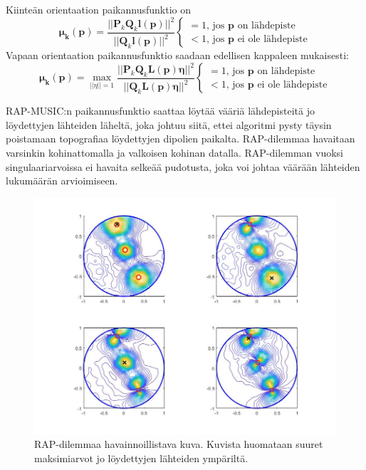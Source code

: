 Kiinteän orientaation paikannusfunktio on
\begin{equation}
    \mathbf{\mu_k(p)} = \frac{||\mathbf{P}_k\mathbf{Q}_k\mathbf{l(p)}||^2}{||\mathbf{Q}_k\mathbf{l(p)}||^2}
    \begin{cases}
    =1\text{, jos $\mathbf{p}$ on lähdepiste}\\
    <1\text{, jos $\mathbf{p}$ ei ole lähdepiste}
     \end{cases}
\end{equation}
Vapaan orientaation paikannusfunktio saadaan edellisen kappaleen mukaisesti:
\begin{equation}
    \mathbf{\mu_k(p)} = \max_{||\eta||=1} \frac{||\mathbf{P}_k\mathbf{Q}_k\mathbf{L(p)\eta}||^2}{||\mathbf{Q}_k\mathbf{L(p)\eta}||^2}
    \begin{cases}
    =1\text{, jos $\mathbf{p}$ on lähdepiste}\\
    <1\text{, jos $\mathbf{p}$ ei ole lähdepiste}
     \end{cases}
\end{equation}

RAP-MUSIC:n paikannusfunktio saattaa löytää vääriä lähdepisteitä jo löydettyjen lähteiden läheltä, joka johtuu siitä, ettei algoritmi pysty täysin poistamaan topografiaa löydettyjen dipolien paikalta. RAP-dilemmaa havaitaan varsinkin kohinattomalla ja valkoisen kohinan datalla. RAP-dilemman vuoksi singulaariarvoissa ei havaita selkeää pudotusta, joka voi johtaa väärään lähteiden lukumäärän arvioimiseen. \citep{Makela2018TruncatedLocalization}

\begin{figure}[hb]
    \centering
    \includegraphics[width=\textwidth]{rapdilemma.jpg}
    \caption{RAP-dilemmaa havainnoillistava kuva. Kuvista huomataan suuret maksimiarvot jo löydettyjen lähteiden ympäriltä.}
    \label{fig:dilemma}
\end{figure}